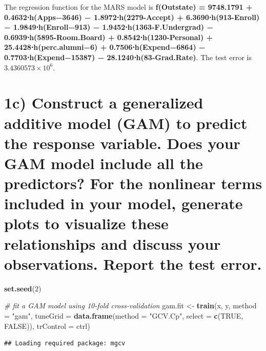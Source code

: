 \documentclass[
]{article}
\newenvironment{Shaded}{\begin{snugshade}}{\end{snugshade}}
\newcommand{\AttributeTok}[1]{\textcolor[rgb]{0.13,0.29,0.53}{#1}}
\newcommand{\CommentTok}[1]{\textcolor[rgb]{0.56,0.35,0.01}{\textit{#1}}}
\newcommand{\ConstantTok}[1]{\textcolor[rgb]{0.56,0.35,0.01}{#1}}
\newcommand{\DecValTok}[1]{\textcolor[rgb]{0.00,0.00,0.81}{#1}}
\newcommand{\FunctionTok}[1]{\textcolor[rgb]{0.13,0.29,0.53}{\textbf{#1}}}
\newcommand{\NormalTok}[1]{#1}
\newcommand{\OtherTok}[1]{\textcolor[rgb]{0.56,0.35,0.01}{#1}}
\newcommand{\StringTok}[1]{\textcolor[rgb]{0.31,0.60,0.02}{#1}}
\begin{document}
The regression function for the MARS model is \textbf{f(Outstate) =
9748.1791 + 0.4632⋅h(Apps−3646) − 1.8972⋅h(2279-Accept) +
6.3690⋅h(913-Enroll) − 1.9849⋅h(Enroll−913) − 1.9452⋅h(1363-F.Undergrad)
− 0.6939⋅h(5895-Room.Board) + 0.8542⋅h(1230-Personal) +
25.4428⋅h(perc.alumni−6) + 0.7506⋅h(Expend−6864) −
0.7703⋅h(Expend−15387) − 28.1240⋅h(83-Grad.Rate)}. The test error is
\ensuremath{3.4360573\times 10^{6}}.

\newpage

\hypertarget{c-construct-a-generalized-additive-model-gam-to-predict-the-response-variable.-does-your-gam-model-include-all-the-predictors-for-the-nonlinear-terms-included-in-your-model-generate-plots-to-visualize-these-relationships-and-discuss-your-observations.-report-the-test-error.}{%
\section{1c) Construct a generalized additive model (GAM) to predict the
response variable. Does your GAM model include all the predictors? For
the nonlinear terms included in your model, generate plots to visualize
these relationships and discuss your observations. Report the test
error.}\label{c-construct-a-generalized-additive-model-gam-to-predict-the-response-variable.-does-your-gam-model-include-all-the-predictors-for-the-nonlinear-terms-included-in-your-model-generate-plots-to-visualize-these-relationships-and-discuss-your-observations.-report-the-test-error.}}

\begin{Shaded}
\begin{Highlighting}[]
\FunctionTok{set.seed}\NormalTok{(}\DecValTok{2}\NormalTok{)}

\CommentTok{\# fit a GAM model using 10{-}fold cross{-}validation}
\NormalTok{gam.fit }\OtherTok{\textless{}{-}} \FunctionTok{train}\NormalTok{(x, y,}
                  \AttributeTok{method =} \StringTok{"gam"}\NormalTok{,}
                  \AttributeTok{tuneGrid =} \FunctionTok{data.frame}\NormalTok{(}\AttributeTok{method =} \StringTok{"GCV.Cp"}\NormalTok{, }\AttributeTok{select =} \FunctionTok{c}\NormalTok{(}\ConstantTok{TRUE}\NormalTok{, }\ConstantTok{FALSE}\NormalTok{)),}
                  \AttributeTok{trControl =}\NormalTok{ ctrl)}
\end{Highlighting}
\end{Shaded}

\begin{verbatim}
## Loading required package: mgcv
\end{verbatim}
\end{document}
